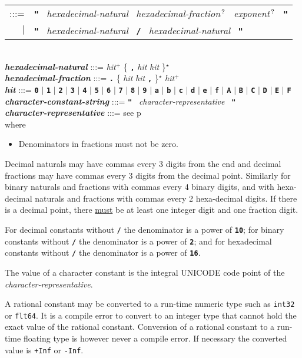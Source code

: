 \documentclass[12pt]{article}
\newcommand{\TT}[1]{{\tt \bfseries #1}}
\newcommand{\STAR}{{\Large $^\star$}}
\newcommand{\PLUS}[1][]{{$^{+#1}$}}
\newcommand{\QMARK}{{$^{\,\mbox{\footnotesize ?}}$}}
\newcommand{\emkey}[1]{{\em \bfseries #1}}
\newcommand{\pagref}[1]{p\pageref{#1}}
\newenvironment{indpar}[1][0.3in]%
	{\begin{list}{}%
		     {\setlength{\itemsep}{0in}%
		      \setlength{\topsep}{0in}%
		      \setlength{\parsep}{1ex}%
		      \setlength{\labelwidth}{#1}%
		      \setlength{\leftmargin}{#1}%
		      \addtolength{\leftmargin}{\labelsep}}%
	 \item}%
	{\end{list}}
\begin{document}
\begin{indpar}
\begin{tabular}[t]{@{}rl}
    :::= & \TT{"}~ {\em hexadecimal-natural}~
                   {\em hexadecimal-fraction}\QMARK{}~
		   {\em exponent}\QMARK{}~ \TT{"} \\
     $|$ & \TT{"}~ {\em hexadecimal-natural}~ \TT{/}~
                   {\em hexadecimal-natural}~ \TT{"} \\
    \end{tabular}
\\[0.5ex]
\emkey{hexadecimal-natural}
    :::= {\em hit}\PLUS{}
           \{ \TT{,} {\em hit} {\em hit} \}\STAR{} \\
\emkey{hexadecimal-fraction} :::=
    \TT{.} \{ {\em hit} {\em hit} \TT{,} \}\STAR{}
    {\em hit}\PLUS{} \\
\emkey{hit} :::= \TT{0} $|$ \TT{1} $|$ \TT{2} $|$ \TT{3} $|$ \TT{4}
	     $|$ \TT{5} $|$ \TT{6} $|$ \TT{7} $|$ \TT{8} $|$ \TT{9}
	     $|$ \TT{a} $|$ \TT{b} $|$ \TT{c} $|$ \TT{d} $|$ \TT{e} $|$ \TT{f}
	     $|$ \TT{A} $|$ \TT{B} $|$ \TT{C} $|$ \TT{D} $|$ \TT{E} $|$ \TT{F}
\\[0.5ex]
\emkey{character-constant-string} :::=
	\TT{"}~ {\em character-representative}~ \TT{"}
\\[0.5ex]
\emkey{character-representative} :::= see \pagref{CHARACTER-REPRESENTATIVE}
\\[1ex]
where
\begin{itemize}
\item Denominators in fractions must not be zero.
\end{itemize}

\end{indpar}

Decimal naturals may have commas
every 3 digits from the end and decimal fractions may have
commas every 3 digits from the decimal point.
Similarly for binary naturals and fractions with commas every 4 binary
digits,
and with hexa-decimal naturals and fractions with commas every 2
hexa-decimal digits.
If there is a decimal point, there \underline{must}
be at least one integer digit and
one fraction digit.

For decimal constants without \TT{/} the denominator is a power of \TT{10}; for
binary constants without \TT{/} the denominator is a power of \TT{2}; and for
hexadecimal constants without \TT{/} the denominator is a power of \TT{16}.

The value of a character constant is the integral UNICODE code point of the
{\em character-representative}.

A rational constant may be converted to a run-time numeric
type such as {\tt int32} or {\tt flt64}.
It is a compile error to convert to an integer type that cannot
hold the exact value of the rational constant.
Conversion of a rational constant
to a run-time floating type is however
never a compile error.  If necessary the converted value is
{\tt +Inf} or {\tt -Inf}.
\end{document}
